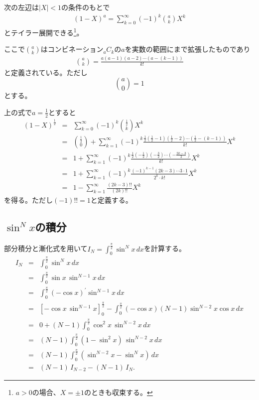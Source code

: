 次の左辺は$|X| < 1$の条件のもとで
\begin{eqnarray*}
(1 - X)^a = \sum_{k=0}^\infty (-1)^k \binom{a}{k} X^k
\end{eqnarray*}
とテイラー展開できる\footnote{$a > 0$の場合、$X = \pm1$のときも収束する。}。\par
ここで$\binom ak$はコンビネーション$_aC_k$の$a$を実数の範囲にまで拡張したものであり
\begin{eqnarray*}
\binom ak = \frac{a(a-1)(a-2)\cdots(a-(k - 1))}{k!}
\end{eqnarray*}
と定義されている。ただし
$$
\binom a0 = 1
$$
とする。\par
上の式で$a = \frac{1}{2}$とすると
\begin{eqnarray*}
(1 - X)^\frac{1}{2} & = & \sum_{k=0}^\infty (-1)^k \binom{\frac{1}{2}}{k} X^k \\
& = & \binom{\frac{1}{2}}{0} + \sum_{k=1}^\infty (-1)^k \frac{\frac{1}{2} \left(\frac{1}{2} - 1 \right)\left(\frac{1}{2}-2\right) \cdots \left(\frac{1}{2} - (k - 1)\right)}{k!} X^k \\
& = & 1 + \sum_{k=1}^\infty (-1)^k \frac{\frac{1}{2} \left(-\frac{1}{2} \right)\left(-\frac{3}{2}\right) \cdots \left(-\frac{2k - 3}{2}\right)}{k!} X^k \\
& = & 1 + \sum_{k=1}^\infty (-1)^k\frac{(-1)^{k - 1}(2k - 3)\cdots3\cdot1}{2^k \cdot k!} X^k \\
& = & 1 - \sum_{k=1}^\infty \frac{(2k - 3)!!}{(2k)!!}  X^k
\end{eqnarray*}
を得る。ただし$(-1)!! = 1$と定義する。

\subsection{$\sin^Nx$の積分}

部分積分と漸化式を用いて$I_N = \int_0^{\frac{\pi}{2}}\sin^N x\,dx$を計算する。
\begin{eqnarray*}
I_N & = & \int_0^{\frac{\pi}{2}}\sin^N x\,dx \\
& = & \int_0^{\frac{\pi}{2}}\sin x \, \sin^{N - 1}x \,dx \\
& = & \int_0^{\frac{\pi}{2}}(-\cos x)^{'} \sin^{N - 1}x \,dx \\
& = & [-\cos x\,\sin^{N - 1}x]_0^\frac{\pi}{2} - \int_0^{\frac{\pi}{2}}(-\cos x)(N -1)\sin^{N - 2}x \cos x\,dx \\
& = & 0 + (N - 1)\int_0^{\frac{\pi}{2}}\cos^2 x\,\sin^{N - 2}x\,dx \\
& = & (N - 1)\int_0^{\frac{\pi}{2}}(1 - \sin^2x)\,\sin^{N - 2}x\,dx \\
& = & (N - 1)\int_0^{\frac{\pi}{2}}(\sin^{N - 2}x - \sin^Nx)\,dx \\
& = & (N - 1)\,I_{N - 2} - (N - 1)\,I_N.
\end{eqnarray*}

